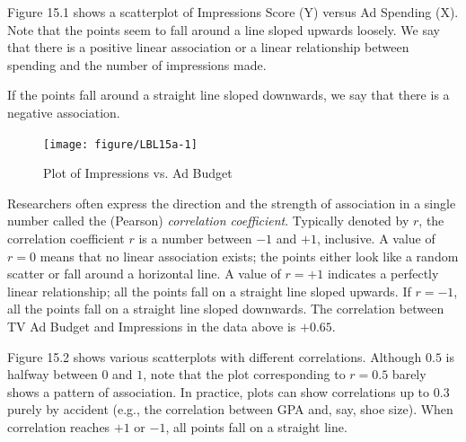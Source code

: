 \documentclass[11pt, chapterprefix=true]{scrbook}\usepackage[]{graphicx}\usepackage[]{color}
\begin{document}
Figure 15.1 shows a scatterplot of Impressions Score (Y) versus Ad Spending (X). Note that the points seem to fall around a line sloped upwards loosely.  We say that there is a positive linear association or a linear relationship between spending and the number of impressions made.  

If the points fall around a straight line sloped downwards, we say that there is a negative association.

\begin{figure}[ht]
\caption{Plot of Impressions vs. Ad Budget}
\centering



{\centering \texttt{[image: figure/LBL15a-1]} 

}



\end{figure}

Researchers often express the direction and the strength of association in a single number called the (Pearson) \textit{correlation coefficient}.  Typically denoted by $r$, the correlation coefficient $r$ is a number between $-1$ and $+1$, inclusive.  A value of $r = 0$ means that no linear association exists; the points either look like a random scatter or fall around a horizontal line.  A value of $r = +1$ indicates a perfectly linear relationship; all the points fall on a straight line sloped upwards.  If $r = -1$, all the points fall on a straight line sloped downwards. The correlation between TV Ad Budget and Impressions in the data above is $+0.65$.

Figure 15.2 shows various scatterplots with different correlations.  Although $0.5$ is halfway between $0$ and $1$, note that the plot corresponding to $r = 0.5$ barely shows a pattern of association.  In practice, plots can show correlations up to $0.3$ purely by accident (e.g., the correlation between GPA and, say, shoe size).  When correlation reaches $+1$ or $-1$, all points fall on a straight line.

\end{document}
